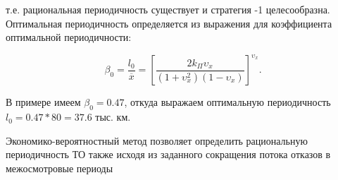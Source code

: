 \documentclass[../nirs.tex]{subfiles}
\begin{document}
т.е. рациональная периодичность существует и стратегия -1 целесообразна.
Оптимальная периодичность определяется из выражения для коэффициента оптимальной
периодичности:

\begin{equation}
    \label{eq:coefficient}
    \beta_0 = \frac{l_0}{\overline{x}} =
    \left[
        \frac%
            { 2 k_\Pi \upsilon_x }%
            {
                \left( 1 + \upsilon_x^2 \right)
                \left( 1 - \upsilon_x \right)
            }
    \right]^{\upsilon_x}.
\end{equation}

В примере имеем $\beta_0 = 0.47$, откуда выражаем оптимальную периодичность
$ l_0 = 0.47 * 80 = 37.6 $ тыс. км.

Экономико-вероятностный метод позволяет определить рациональную периодичность ТО
также исходя из заданного сокращения потока отказов в межосмотровые периоды
\end{document}

